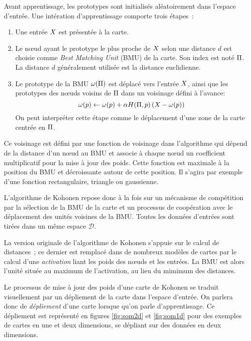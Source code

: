 \documentclass[../main]{subfiles}
\begin{document}
Avant apprentissage, les prototypes sont initialisés aléatoirement dans l'espace d'entrée.
Une intération d'apprentissage comporte trois étapes~:
\begin{enumerate}
\item Une entrée $X$ est présentée à la carte.
\item Le n\oe{}ud ayant le prototype le plus proche de $X$ selon une distance $d$ est choisie comme \emph{Best Matching Unit} (BMU) de la carte. Son index est noté $\Pi$. La distance $d$ généralement utilisée est la distance euclidienne.
\item Le prototype de la BMU $\omega(\Pi)$ est déplacé vers l'entrée $X$, ainsi que les prototypes des n\oe{}uds voisins de $\Pi$ dans un voisinage défini à l'avance:
$$ \omega(p) \leftarrow \omega(p) + \alpha H(\Pi,p) \left( X - \omega(p)\right)$$
On peut interpréter cette étape comme le déplacement d'une zone de la carte centrée en $\Pi$. 
\end{enumerate}

Ce voisinage est défini par une fonction de voisinage dans l'algorithme qui dépend de la distance d'un n\oe{}ud au BMU et associe à chaque n\oe{}ud un coefficient multiplicatif pour la mise à jour des poids. Cette fonction est maximale à la position du BMU et décroissante autour de cette position. Il s'agira par exemple d'une fonction rectangulaire, triangle ou gaussienne.

L'algorithme de Kohonen repose donc à la fois sur un mécanisme de compétition par la sélection de la BMU de la carte et un processus de coopération avec le déplacement des unités voisines de la BMU.
Toutes les données d'entrées sont tirées dans un même espace $\mathcal{D}$. 

La version originale de l'algorithme de Kohonen s'appuie sur le calcul de distances~; ce dernier est remplacé dans de nombreux modèles de cartes par le calcul d'une \emph{activation} liant les poids des n\oe{}uds et les entrées. La BMU est alors l'unité située au maximum de l'activation, au lieu du mimimum des distances.


Le processus de mise à jour des poids d'une carte de Kohonen se traduit visuellement par un dépliement de la carte dans l'espace d'entrée. On parlera donc de \emph{dépliement} d'une carte lorsque qu'on parle d'apprentissage. Ce dépliement est représenté en figures \ref{fig:som2d} et \ref{fig:som1d} pour des exemples de cartes en une et deux dimensions, se dépliant sur des données en deux dimensions. 
\end{document}
